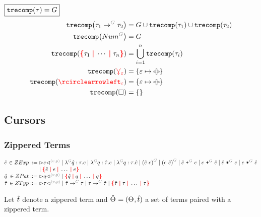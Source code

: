 \noindent $\boxed{\operatorname{\texttt{trecomp}}\mathopen{}\left(\tau\right)\mathclose{} = G}$
%
\begin{align*}
  \trecomp{\tArrow{G}{\tau_1}{\tau_2}}
    &= G \cup \trecomp{\tau_1} \cup \trecomp{\tau_2}
  \\
  \trecomp{\tNum{G}} &= G
  \\
  \trecomp{\conflictHole{\tau_1, \cdots, \tau_n}} &= \bigcup_{i=1}^n \trecomp{\tau_i}
  \\
  \trecomp{\multiVertex{\e}} &= \SetOf{\e \mapsto \Plus}
  \\
  \trecomp{\cycleVertex{\e}} &= \SetOf{\e \mapsto \Plus}
  \\
  \trecomp{\hole} &= \SetOf{}
\end{align*}


\subsection{Cursors}


\subsubsection{Zippered Terms}

\[
  \arraycolsep=0pt
  \begin{array}{lrlll}
    \Z{e} & {}\in ZExp & {}::={} &
      \cursor{v}{p}{e}
      \mid \eFun{G}{\Z{q}}{\tau}{e}
      \mid \eFun{G}{q}{\Z{\tau}}{e}
      \mid \eFun{G}{q}{\tau}{\Z{e}}
      \mid \eApp{G}{\Z{e}}{e}
      \mid \eApp{G}{e}{\Z{e}}
      \mid \ePlus{G}{\Z{e}}{e}
      \mid \ePlus{G}{e}{\Z{e}}
      \mid \eTimes{G}{\Z{e}}{e}
      \mid \eTimes{G}{e}{\Z{e}} \\
    &&&
      \mid \conflictHole{\Z{e}, e, \ldots, e}
    \\
    \Z{q} & {}\in ZPat & {}::={} &
      \cursor{v}{p}{q}
      \mid \conflictHole{\Z{q}, q, \ldots, q}
    \\
    \Z{\tau} & {}\in ZTyp & {}::={} &
      \cursor{v}{p}{\tau}
      \mid \tArrow{G}{\Z{\tau}}{\tau}
      \mid \tArrow{G}{\tau}{\Z{\tau}}
      \mid \conflictHole{\Z{\tau}, \tau, \ldots, \tau}
    \\
  \end{array}
\]

Let $\hat{t}$ denote a zippered term
and $\hat{\Theta_{}} = (\Theta_{}, \hat{t})$ a set of terms paired with a zippered term.

